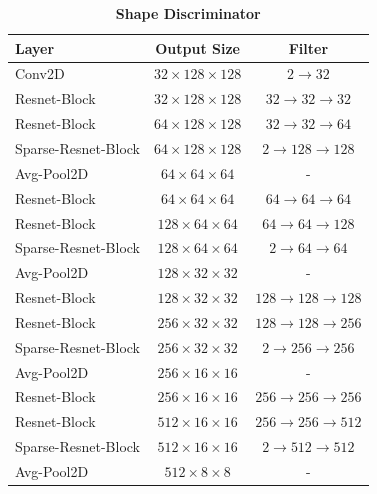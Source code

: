 \begin{table}[h]
\caption{\textbf{Shape Discriminator}} %
\centering %
\begin{tabular}{l c c}
\toprule
\textbf{Layer} & \textbf{Output Size} & \textbf{Filter} \\ \midrule
\small{Conv2D} & \small{$32 \times 128 \times 128$} & \small{$2 \rightarrow 32$} \\
\midrule
\small{Resnet-Block} & \small{$32 \times 128 \times 128$} & \small{$32 \rightarrow 32 \rightarrow 32$} \\
\small{Resnet-Block} & \small{$64 \times 128 \times 128$} & \small{$32 \rightarrow 32 \rightarrow 64$} \\
\small{Sparse-Resnet-Block} & \small{$64 \times 128 \times 128$} & \small{$2 \rightarrow 128 \rightarrow 128$} \\
\small{Avg-Pool2D} & \small{$64 \times 64 \times 64$} & - \\
\midrule
\small{Resnet-Block} & \small{$64 \times 64 \times 64$} & \small{$64 \rightarrow 64 \rightarrow 64$} \\
\small{Resnet-Block} & \small{$128 \times 64 \times 64$} & \small{$64 \rightarrow 64 \rightarrow 128$} \\
\small{Sparse-Resnet-Block} & \small{$128 \times 64 \times 64$} & \small{$2 \rightarrow 64 \rightarrow 64$} \\
\small{Avg-Pool2D} & \small{$128 \times 32 \times 32$} & - \\
\midrule
\small{Resnet-Block} & \small{$128 \times 32 \times 32$} & \small{$128 \rightarrow 128 \rightarrow 128$} \\
\small{Resnet-Block} & \small{$256 \times 32 \times 32$} & \small{$128 \rightarrow 128 \rightarrow 256$} \\
\small{Sparse-Resnet-Block} & \small{$256 \times 32 \times 32$} & \small{$2 \rightarrow 256 \rightarrow 256$} \\
\small{Avg-Pool2D} & \small{$256 \times 16 \times 16$} & - \\
\midrule
\small{Resnet-Block} & \small{$256 \times 16 \times 16$} & \small{$256 \rightarrow 256 \rightarrow 256$} \\
\small{Resnet-Block} & \small{$512 \times 16 \times 16$} & \small{$256 \rightarrow 256 \rightarrow 512$} \\
\small{Sparse-Resnet-Block} & \small{$512 \times 16 \times 16$} & \small{$2 \rightarrow 512 \rightarrow 512$} \\
\small{Avg-Pool2D} & \small{$512 \times 8 \times 8$} & - \\

\end{tabular}
\end{table}
